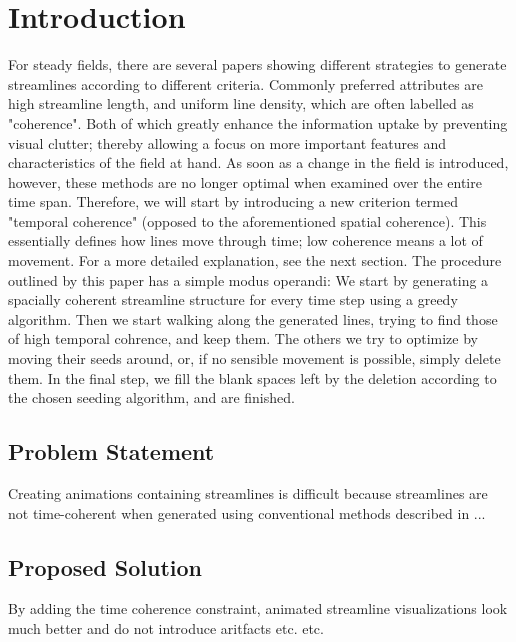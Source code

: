 
\chapter{Introduction}

For steady fields, there are several papers showing different strategies to generate streamlines according to different criteria.
Commonly preferred attributes are high streamline length, and uniform line density, which are often labelled as "coherence".
Both of which greatly enhance the information uptake by preventing visual clutter;
thereby allowing a focus on more important features and characteristics of the field at hand.
As soon as a change in the field is introduced, however, these methods are no longer optimal when examined over the entire time span.
Therefore, we will start by introducing a new criterion termed "temporal coherence" (opposed to the aforementioned spatial coherence).
This essentially defines how lines move through time; low coherence means a lot of movement. For a more detailed explanation, see the next section.
The procedure outlined by this paper has a simple modus operandi:
We start by generating a spacially coherent streamline structure for every time step using a greedy algorithm.
Then we start walking along the generated lines, trying to find those of high temporal cohrence, and keep them.
The others we try to optimize by moving their seeds around, or, if no sensible movement is possible, simply delete them.
In the final step, we fill the blank spaces left by the deletion according to the chosen seeding algorithm, and are finished.

\section{Problem Statement}
Creating animations containing streamlines is difficult because streamlines are not time-coherent when generated using conventional methods described in ...

\section{Proposed Solution}
By adding the time coherence constraint, animated streamline visualizations look much better and do not introduce aritfacts etc. etc.




